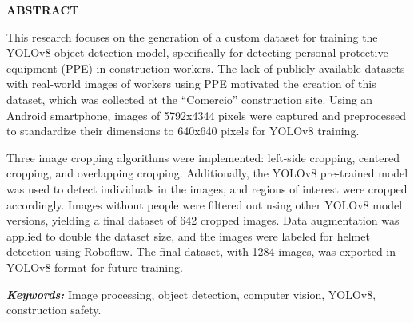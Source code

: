 \thispagestyle{plain}

\newpage

\begin{center}
  \textbf{ABSTRACT}
\end{center}

\vspace{1cm}

This research focuses on the generation of a custom dataset for training the YOLOv8 object detection model, specifically for detecting personal protective equipment (PPE) in construction workers. The lack of publicly available datasets with real-world images of workers using PPE motivated the creation of this dataset, which was collected at the ``Comercio'' construction site. Using an Android smartphone, images of 5792x4344 pixels were captured and preprocessed to standardize their dimensions to 640x640 pixels for YOLOv8 training.

Three image cropping algorithms were implemented: left-side cropping, centered cropping, and overlapping cropping. Additionally, the YOLOv8 pre-trained model was used to detect individuals in the images, and regions of interest were cropped accordingly. Images without people were filtered out using other YOLOv8 model versions, yielding a final dataset of 642 cropped images. Data augmentation was applied to double the dataset size, and the images were labeled for helmet detection using Roboflow. The final dataset, with 1284 images, was exported in YOLOv8 format for future training.

\textit{\textbf{Keywords:}} Image processing, object detection, computer vision, YOLOv8, construction safety.

\vfill

\pagebreak
